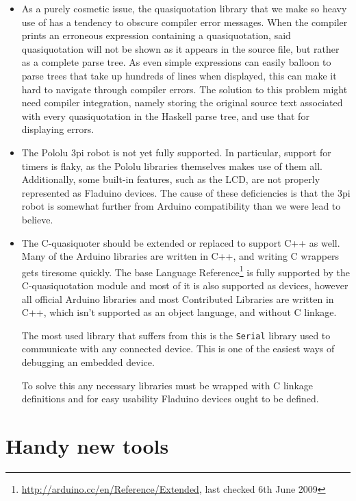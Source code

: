 \documentclass[a4paper, oneside, final]{memoir}
\begin{document}
\begin{itemize}
\item As a purely cosmetic issue, the quasiquotation library that we
  make so heavy use of has a tendency to obscure compiler error
  messages.  When the compiler prints an erroneous expression
  containing a quasiquotation, said quasiquotation will not be shown
  as it appears in the source file, but rather as a complete parse
  tree.  As even simple expressions can easily balloon to parse trees
  that take up hundreds of lines when displayed, this can make it hard
  to navigate through compiler errors.  The solution to this problem
  might need compiler integration, namely storing the original source
  text associated with every quasiquotation in the Haskell parse tree,
  and use that for displaying errors.
\item The Pololu 3pi robot is not yet fully supported.  In particular,
  support for timers is flaky, as the Pololu libraries themselves
  makes use of them all.  Additionally, some built-in features, such
  as the LCD, are not properly represented as Fladuino devices.  The
  cause of these deficiencies is that the 3pi robot is somewhat
  further from Arduino compatibility than we were lead to believe.
\item The C-quasiquoter should be extended or replaced to support C++
  as well.  Many of the Arduino libraries are written in C++, and
  writing C wrappers gets tiresome quickly.  The base Language
  Reference\footnote{\url{http://arduino.cc/en/Reference/Extended},
    last checked 6th June 2009} is fully supported by the
  C-quasiquotation module and most of it is also supported as devices,
  however all official Arduino libraries and most Contributed
  Libraries are written in C++, which isn't supported as an object
  language, and without C linkage.

  The most used library that suffers from this is the \texttt{Serial}
  library used to communicate with any connected device. This is one
  of the easiest ways of debugging an embedded device.

  To solve this any necessary libraries must be wrapped with C linkage
  definitions and for easy usability Fladuino devices ought to be
  defined.
\end{itemize}

\section{Handy new tools}
\end{document}
